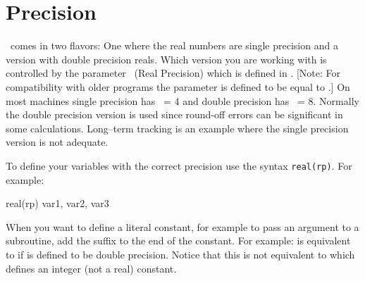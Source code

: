 \section{Precision}

\bmad\ comes in two flavors: One where the real numbers are single
precision and a version with double precision reals. Which version you
are working with is controlled by the parameter \ (Real Precision)
which is defined in . [Note: For compatibility with older
programs the parameter  is defined to be equal to .]  On most
machines single precision has \ = 4 and double precision has \ =
8. Normally the double precision version is used since round-off
errors can be significant in some calculations. Long--term tracking is
an example where the single precision version is not adequate. 

To define your variables with the correct precision use the syntax
{\tt real(rp)}. For example:
\begin{example}
    real(rp) var1, var2, var3
\end{example}
When you want to define a literal constant, for example to pass an
argument to a subroutine, add the suffix  to the end of the
constant. For example:  is equivalent to  if
 is defined to be double precision. Notice that this is not
equivalent to  which defines an integer (not a real) constant.



